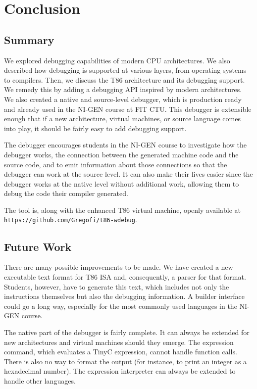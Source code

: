 \chapter{Conclusion}
\section{Summary}
We explored debugging capabilities of modern CPU architectures. We also
described how debugging is supported at various layers, from operating systems
to compilers. Then, we discuss the T86 architecture and its debugging support.
We remedy this by adding a debugging API inspired by modern architectures. We
also created a native and source-level debugger, which is production ready and
already used in the NI-GEN course at FIT CTU. This debugger is extensible
enough that if a new architecture, virtual machines, or source language comes
into play, it should be fairly easy to add debugging support.

The debugger encourages students in the NI-GEN course to investigate how the
debugger works, the connection between the generated machine code and the
source code, and to emit information about those connections so that the
debugger can work at the source level. It can also make their lives easier
since the debugger works at the native level without additional work, allowing
them to debug the code their compiler generated.

The tool is, along with the enhanced T86 virtual machine, openly available at \\  
\verb|https://github.com/Gregofi/t86-wdebug|.

\section{Future Work}
There are many possible improvements to be made. We have created a new
executable text format for T86 ISA and, consequently, a parser for that format.
Students, however, have to generate this text, which includes not only the
instructions themselves but also the debugging information. A builder interface
could go a long way, especially for the most commonly used languages in the
NI-GEN course.

The native part of the debugger is fairly complete. It can always be extended
for new architectures and virtual machines should they emerge. The expression
command, which evaluates a TinyC expression, cannot handle function calls.
There is also no way to format the output (for instance, to print an integer as
a hexadecimal number). The expression interpreter can always be extended to
handle other languages.


